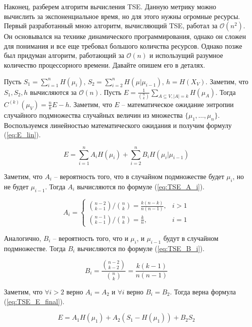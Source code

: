 \documentclass{spbau-diploma}
\begin{document}
Наконец, разберем алгоритм вычисления TSE. Данную метрику можно вычислить за экспоненциальное время, но для этого нужны огромные ресурсы. Первый разработанный мною алгоритм, вычисляющий TSE, работал за $\mathcal{O}(n^2)$. Он основывался на технике динамического программирования, однако он сложен для понимания и все еще требовал большого количства ресурсов. Однако позже был придуман алгоритм, работающий за $\mathcal{O}(n)$ и использущий разумное количество процессорного времени. Давайте опишем его в деталях.

Пусть $S_1 = \sum\limits_{i=1}^{n}H(\mu_i)$, $S_2 = \sum\limits_{i=2}^{n}H(\mu|\mu_{i-1})$, $h = H(X_V)$. Заметим, что $S_1,S_2,h$ вычисляются за $\mathcal{O}(n)$. Пусть $E = \frac{1}{\binom{n}{k}}\sum\limits_{A\subseteq V,|A|=k}H(\mu_A)$. Тогда $C^{(k)}(\mu_V) = \frac{n}{k}E - h$. Заметим, что $E$ -- математическое ожидание энтропии случайного подмножества случайных величин из множества $\{\mu_1,\ldots,\mu_n\}$. Воспользуемся линейностью математического ожидания и получим формулу (\ref{eq:E_lin}).

\begin{equation} \label{eq:E_lin}
E = \sum\limits_{i=1}^{n}A_iH(\mu_i) + \sum\limits_{i=2}^{n}B_iH(\mu_i|\mu_{i-1})
\end{equation}

Заметим, что $A_i$ -- вероятность того, что в случайном подмножестве будет $\mu_i$, но не будет $\mu_{i-1}$. Тогда $A_i$ вычисляются по формуле (\ref{eq:TSE_A_i}).

\begin{equation} \label{eq:TSE_A_i}
A_i = 
\begin{cases}
\binom{n-2}{k-1}/\binom{n}{k}=\frac{k(n-k)}{n(n-1)},& i > 1 \\
\binom{n-1}{k-1}/\binom{n}{k}=\frac k n,& i = 1
\end{cases}
\end{equation}

Аналогично, $B_i$ -- вероятность того, что и $\mu_i$, и $\mu_{i-1}$ будут в случайном подмножестве. Тогда $B_i$ вычисляются по формуле (\ref{eq:TSE_B_i}).

\begin{equation} \label{eq:TSE_B_i}
B_i = \frac{\binom{n-2}{k-2}}{\binom{n}{k}} = \frac{k(k-1)}{n(n-1)}
\end{equation}

Заметим, что $\forall i > 2$ верно $A_i = A_2$ и $\forall i$ верно $B_i = B_2$. Тогда верна формула (\ref{eq:TSE_E_final}).

\begin{equation} \label{eq:TSE_E_final}
E = A_1H(\mu_1) + A_2(S_1 - H(\mu_1)) + B_2S_2
\end{equation}
\end{document}
